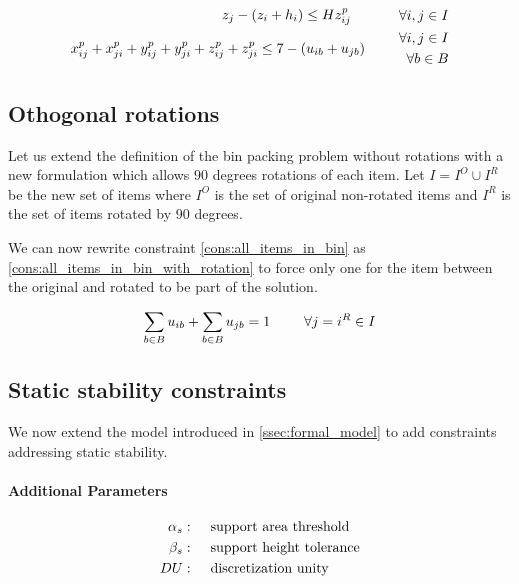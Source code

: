 \begin{align}
\begin{aligned}
                    z_j - (z_i + h_i) &\le H z^p_{ij} \end{aligned} \hspace{.5cm}& & \forall i,j \in I \label{cons:z_prec} \\
    x^p_{ij} + x^p_{ji} + y^p_{ij} + y^p_{ji} + z^p_{ij} + z^p_{ji} \le 7 - (u_{ib} + u_{jb}) \hspace{.5cm}& & \begin{aligned} \forall i,j \in I \\ 
                                                                                                                                \forall b \in B 
                                                                                                                        \end{aligned} \label{cons:no_overlap}
\end{align}
\subsection*{Othogonal rotations}

Let us extend the definition of the bin packing problem without rotations with a new formulation which allows $90$ degrees rotations of each item.
Let $I = I^O \cup I^R$ be the new set of items where $I^O$ is the set of original non-rotated items and $I^R$ is the set of items rotated by $90$ degrees.

We can now rewrite constraint \ref{cons:all_items_in_bin} as \ref{cons:all_items_in_bin_with_rotation} to force only one for the item between the original and rotated to be part of the solution.

\begin{align}
    \sum_{b \in B} u_{ib} + \sum_{b \in B} u_{jb} = 1  \hspace{.5cm}& & \forall j = i^R \in I \label{cons:all_items_in_bin_with_rotation}
\end{align}

\subsection*{Static stability constraints}

We now extend the model introduced in \cref{ssec:formal_model} to add constraints addressing static stability.

\paragraph*{Additional Parameters}
\begin{align*}
    \alpha_s  :\hspace{.5cm}& \text{support area threshold} \\
    \beta_s  :\hspace{.5cm}& \text{support height tolerance} \\
    DU      :\hspace{.5cm}& \text{discretization unity} \\
\end{align*}

